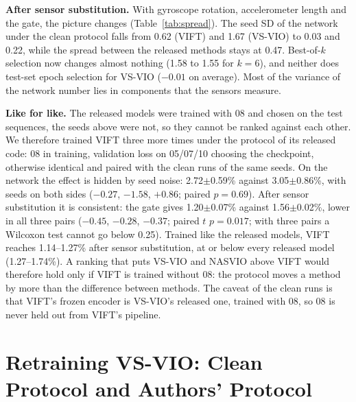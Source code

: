 \documentclass[letterpaper,journal]{IEEEtran}
\begin{document}
\textbf{After sensor substitution.} With gyroscope rotation, accelerometer length and the gate, the picture changes (Table~\ref{tab:spread}). The seed SD of the network under the clean protocol falls from 0.62 (VIFT) and 1.67 (VS-VIO) to 0.03 and 0.22, while the spread between the released methods stays at 0.47. Best-of-$k$ selection now changes almost nothing (1.58 to 1.55 for $k=6$), and neither does test-set epoch selection for VS-VIO ($-0.01$ on average). Most of the variance of the network number lies in components that the sensors measure.

\textbf{Like for like.} The released models were trained with 08 and chosen on the test sequences, the seeds above were not, so they cannot be ranked against each other. We therefore trained VIFT three more times under the protocol of its released code: 08 in training, validation loss on 05/07/10 choosing the checkpoint, otherwise identical and paired with the clean runs of the same seeds. On the network the effect is hidden by seed noise: 2.72$\pm$0.59\% against 3.05$\pm$0.86\%, with seeds on both sides ($-0.27$, $-1.58$, $+0.86$; paired $p=0.69$). After sensor substitution it is consistent: the gate gives 1.20$\pm$0.07\% against 1.56$\pm$0.02\%, lower in all three pairs ($-0.45$, $-0.28$, $-0.37$; paired $t$ $p=0.017$; with three pairs a Wilcoxon test cannot go below 0.25). Trained like the released models, VIFT reaches 1.14--1.27\% after sensor substitution, at or below every released model (1.27--1.74\%). A ranking that puts VS-VIO and NASVIO above VIFT would therefore hold only if VIFT is trained without 08: the protocol moves a method by more than the difference between methods. The caveat of the clean runs is that VIFT's frozen encoder is VS-VIO's released one, trained with 08, so 08 is never held out from VIFT's pipeline.

\section{Retraining VS-VIO: Clean Protocol and Authors' Protocol}
\label{sec:e5}
\end{document}
